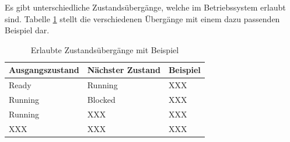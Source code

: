 Es gibt unterschiedliche Zustandsübergänge, welche im Betriebssystem erlaubt sind. Tabelle \ref{table:State-transition} stellt die verschiedenen Übergänge mit einem dazu passenden Beispiel dar.

\begin{table}[H]
\begin{tabular}{p{2.5cm} | p{2.5cm} | p{8cm}}
  \textbf{Ausgangszustand} & \textbf{Nächster Zustand} & \textbf{Beispiel} 
  \\ \hline
  Ready & Running & XXX \\
  Running & Blocked & XXX \\
  Running & XXX & XXX \\
  XXX & XXX & XXX \\
  
 \end{tabular}
 \caption{Erlaubte Zustandsübergänge mit Beispiel}
 \label{table:State-transition}
\end{table}

\pagebreak 